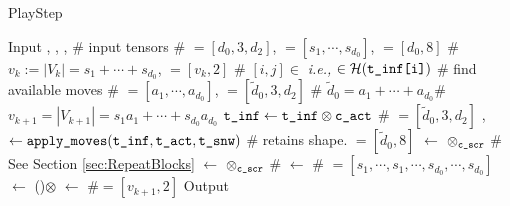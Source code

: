 
\begin{algorithm}
\caption{PlayStep}
\label{alg:your_algorithm}
\begin{algorithmic}[1]
\State Input , , , 
\hfill \textcolor{green!50!black}{\scriptsize \# input tensors}
\Statex \textcolor{green!50!black}{\scriptsize \# $=[d_0,3,d_2]$, 
$= [s_1,\cdots,s_{d_0}]$,  $=[d_0,8]$}
\Statex \textcolor{green!50!black}{\scriptsize \# $v_k:= \left\vert V_k\right\vert = s_1+\cdots+s_{d_0}$, $=[v_k,2]$}
\Statex \textcolor{green!50!black}{\scriptsize \# $[i,j] \in $  \textit{i.e.,}  $\in \mathcal{H}(\texttt{t\_inf[i]})$} 
\vspace{0.5em}
\State {} \hfill \textcolor{green!50!black}{\scriptsize \# find available moves}
\Statex \textcolor{green!50!black}{\scriptsize \#  $= [a_1,\cdots,a_{d_0}]$,  $= [\tilde{d}_0,3,d_2]$}
\Statex \textcolor{green!50!black}{\scriptsize \# $\tilde{d}_0 = a_1+\cdots+a_{d_0}$}\Statex\textcolor{green!50!black}{\scriptsize\#$v_{k+1} = \left\vert V_{k+1}\right\vert =s_1a_1+\cdots+s_{d_0}a_{d_0}$}
\vspace{0.5em}
\State $\texttt{t\_inf} \gets \texttt{t\_inf} \otimes \texttt{c\_act}$ \hfill \textcolor{green!50!black}{\scriptsize \# $=[\tilde{d}_0,3,d_2]$}
\State {},  $\gets \texttt{apply\_moves}(\texttt{t\_inf}, \texttt{t\_act}, \texttt{t\_snw})$
\Statex \textcolor{green!50!black}{\scriptsize \#  retains shape. $=[\tilde{d}_0,8]$}
\State {} $\gets$ $\otimes_{\tiny\texttt{c\_scr}}$
\hfill 
\textcolor{green!50!black}{\scriptsize\# See Section \ref{sec:RepeatBlocks}}
\State {} $\gets$ $\otimes_{\texttt{c\_scr}}$
\hfill \textcolor{green!50!black}{\scriptsize\# }
\State {} $\gets$ 
\hfill \textcolor{green!50!black}{\scriptsize\# $=[s_1,\cdots,s_1,\cdots,s_{d_0},\cdots,s_{d_0}]$}
\State {} $\gets$ ()$\otimes$
\State {} $\gets$   \hfill \textcolor{green!50!black}{\scriptsize \#$=[v_{k+1},2]$}
\State Output 
\end{algorithmic}
\end{algorithm}
